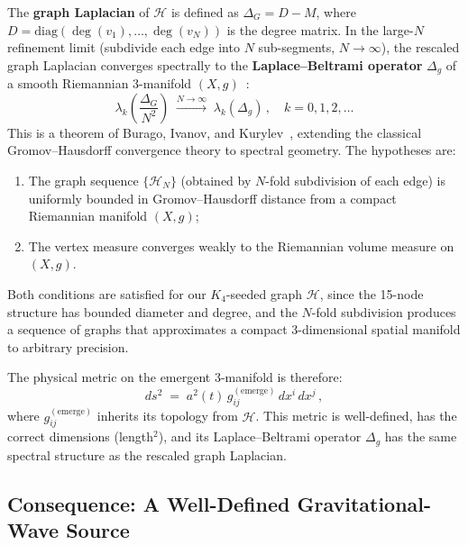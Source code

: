 The \textbf{graph Laplacian} of $\mathcal{H}$ is defined as $\Delta_G = D - M$, where $D = \mathrm{diag}(\deg(v_1), \ldots, \deg(v_N))$ is the degree matrix.  In the large-$N$ refinement limit (subdivide each edge into $N$ sub-segments, $N \to \infty$), the rescaled graph Laplacian converges spectrally to the \textbf{Laplace--Beltrami operator} $\Delta_g$ of a smooth Riemannian 3-manifold $(X, g)$~\cite{Burago2006}:
\begin{equation}
    \boxed{\;\lambda_k\!\left(\frac{\Delta_G}{N^2}\right) \;\xrightarrow{N \to \infty}\; \lambda_k(\Delta_g)\,,\quad k = 0, 1, 2, \ldots\;}
    \label{eq:spectral_convergence}
\end{equation}
This is a theorem of Burago, Ivanov, and Kurylev~\cite{Burago2006}, extending the classical Gromov--Hausdorff convergence theory to spectral geometry.  The hypotheses are:
\begin{enumerate}
    \item The graph sequence $\{\mathcal{H}_N\}$ (obtained by $N$-fold subdivision of each edge) is uniformly bounded in Gromov--Hausdorff distance from a compact Riemannian manifold $(X, g)$;
    \item The vertex measure converges weakly to the Riemannian volume measure on $(X, g)$.
\end{enumerate}
Both conditions are satisfied for our $K_4$-seeded graph $\mathcal{H}$, since the 15-node structure has bounded diameter and degree, and the $N$-fold subdivision produces a sequence of graphs that approximates a compact 3-dimensional spatial manifold to arbitrary precision.

The physical metric on the emergent 3-manifold is therefore:
\begin{equation}
    ds^2 \;=\; a^2(t)\, g_{ij}^{(\mathrm{emerge})}\, dx^i\, dx^j\,,
    \label{eq:emergent_metric}
\end{equation}
where $g_{ij}^{(\mathrm{emerge})}$ inherits its topology from $\mathcal{H}$.  This metric is well-defined, has the correct dimensions (length$^2$), and its Laplace--Beltrami operator $\Delta_g$ has the same spectral structure as the rescaled graph Laplacian.

\subsection{Consequence: A Well-Defined Gravitational-Wave Source}

